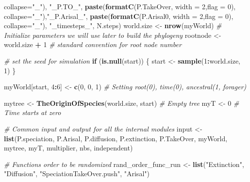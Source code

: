 \documentclass[]{book}
\newenvironment{Shaded}{\begin{snugshade}}{\end{snugshade}}
\newcommand{\KeywordTok}[1]{\textcolor[rgb]{0.13,0.29,0.53}{\textbf{{#1}}}}
\newcommand{\DataTypeTok}[1]{\textcolor[rgb]{0.13,0.29,0.53}{{#1}}}
\newcommand{\DecValTok}[1]{\textcolor[rgb]{0.00,0.00,0.81}{{#1}}}
\newcommand{\StringTok}[1]{\textcolor[rgb]{0.31,0.60,0.02}{{#1}}}
\newcommand{\CommentTok}[1]{\textcolor[rgb]{0.56,0.35,0.01}{\textit{{#1}}}}
\newcommand{\ControlFlowTok}[1]{\textcolor[rgb]{0.13,0.29,0.53}{\textbf{{#1}}}}
\newcommand{\OperatorTok}[1]{\textcolor[rgb]{0.81,0.36,0.00}{\textbf{{#1}}}}
\newcommand{\NormalTok}[1]{{#1}}
\theoremstyle{definition}
\theoremstyle{definition}
\theoremstyle{definition}
\theoremstyle{remark}
\begin{document}
\begin{Shaded}
\begin{Highlighting}[]
                         \DataTypeTok{collapse=}\StringTok{"_"}\NormalTok{), }\StringTok{"_P.TO_"}\NormalTok{,}
                   \KeywordTok{paste}\NormalTok{(}\KeywordTok{formatC}\NormalTok{(P.TakeOver, }\DataTypeTok{width =} \DecValTok{2}\NormalTok{,}\DataTypeTok{flag =} \DecValTok{0}\NormalTok{),}
                         \DataTypeTok{collapse=}\StringTok{"_"}\NormalTok{),}\StringTok{"_P.Arisal_"}\NormalTok{,}
                   \KeywordTok{paste}\NormalTok{(}\KeywordTok{formatC}\NormalTok{(P.Arisal0, }\DataTypeTok{width =} \DecValTok{2}\NormalTok{,}\DataTypeTok{flag =} \DecValTok{0}\NormalTok{),}
                         \DataTypeTok{collapse=}\StringTok{"_"}\NormalTok{), }\StringTok{"_timesteps_"}\NormalTok{,}
\NormalTok{                   N.steps)}
\NormalTok{  world.size <-}\StringTok{ }\KeywordTok{nrow}\NormalTok{(myWorld)}
  \CommentTok{# Initialize parameters we will use later to build the phylogeny}
\NormalTok{  rootnode <-}\StringTok{  }\NormalTok{world.size }\OperatorTok{+}\StringTok{ }\DecValTok{1} \CommentTok{# standard convention for root node number}

  \CommentTok{# set the seed for simulation}
  \ControlFlowTok{if}\NormalTok{ (}\KeywordTok{is.null}\NormalTok{(start)) \{}
\NormalTok{    start <-}\StringTok{ }\KeywordTok{sample}\NormalTok{(}\DecValTok{1}\OperatorTok{:}\NormalTok{world.size, }\DecValTok{1}\NormalTok{)}
\NormalTok{  \}}

\NormalTok{  myWorld[start, }\DecValTok{4}\OperatorTok{:}\DecValTok{6}\NormalTok{] <-}\StringTok{ }\KeywordTok{c}\NormalTok{(}\DecValTok{0}\NormalTok{, }\DecValTok{0}\NormalTok{, }\DecValTok{1}\NormalTok{) }\CommentTok{# Setting root(0), time(0), ancestral(1, forager)}

\NormalTok{  mytree <-}\StringTok{ }\KeywordTok{TheOriginOfSpecies}\NormalTok{(world.size, start) }\CommentTok{# Empty tree}
\NormalTok{  myT <-}\StringTok{ }\DecValTok{0} \CommentTok{# Time starts at zero}

  \CommentTok{# Common input and output for all the internal modules}
\NormalTok{  input <-}\StringTok{ }\KeywordTok{list}\NormalTok{(P.speciation, P.Arisal, P.diffusion, P.extinction, P.TakeOver,}
\NormalTok{                myWorld, mytree, myT, multiplier, nbs, independent)}

  \CommentTok{# Functions order to be randomized}
\NormalTok{  rand_order_func_run <-}\StringTok{ }\KeywordTok{list}\NormalTok{(}\StringTok{"Extinction"}\NormalTok{, }\StringTok{"Diffusion"}\NormalTok{,}
                              \StringTok{"SpeciationTakeOver.push"}\NormalTok{, }\StringTok{"Arisal"}\NormalTok{)}


\end{Highlighting}
\end{Shaded}
\end{document}
